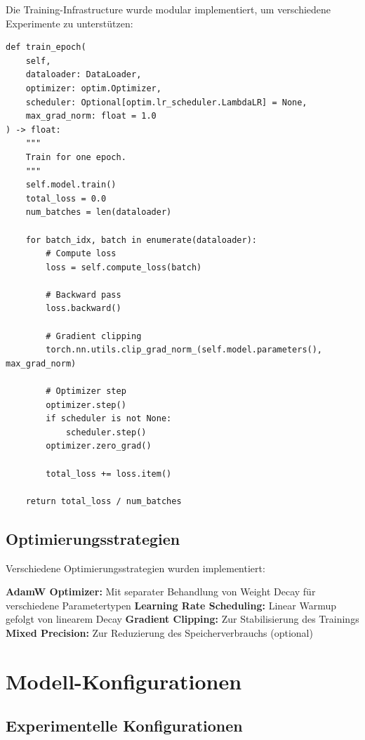 Die Training-Infrastructure wurde modular implementiert, um verschiedene Experimente zu unterstützen:

\begin{lstlisting}[style=pythonstyle, caption=Training Loop Implementierung]
def train_epoch(
    self, 
    dataloader: DataLoader, 
    optimizer: optim.Optimizer,
    scheduler: Optional[optim.lr_scheduler.LambdaLR] = None,
    max_grad_norm: float = 1.0
) -> float:
    """
    Train for one epoch.
    """
    self.model.train()
    total_loss = 0.0
    num_batches = len(dataloader)
    
    for batch_idx, batch in enumerate(dataloader):
        # Compute loss
        loss = self.compute_loss(batch)
        
        # Backward pass
        loss.backward()
        
        # Gradient clipping
        torch.nn.utils.clip_grad_norm_(self.model.parameters(), max_grad_norm)
        
        # Optimizer step
        optimizer.step()
        if scheduler is not None:
            scheduler.step()
        optimizer.zero_grad()
        
        total_loss += loss.item()
    
    return total_loss / num_batches
\end{lstlisting}

\subsection{Optimierungsstrategien}

Verschiedene Optimierungsstrategien wurden implementiert:

\textbf{AdamW Optimizer:} Mit separater Behandlung von Weight Decay für verschiedene Parametertypen
\textbf{Learning Rate Scheduling:} Linear Warmup gefolgt von linearem Decay
\textbf{Gradient Clipping:} Zur Stabilisierung des Trainings
\textbf{Mixed Precision:} Zur Reduzierung des Speicherverbrauchs (optional)

\section{Modell-Konfigurationen}

\subsection{Experimentelle Konfigurationen}

